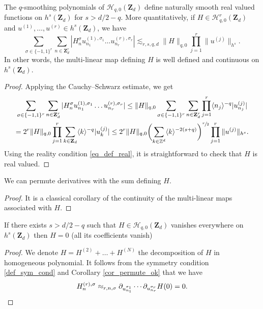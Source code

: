 \begin{lemma}
\label{lem_val_ham}
The $q$-smoothing polynomials of $ \mathscr{H}_{q,0}(\mathbf{Z}_d)$ define naturally smooth real valued functions on $h^s(\mathbf{Z}_d)$ for $s > d/2-q$. More quantitatively, if $H\in \mathscr{H}_{q,0}^r(\mathbf{Z}_d)$ and $u^{(1)},\dots,u^{(r)} \in h^s(\mathbf{Z}_d)$, we have
\[
\sum_{\sigma \in \{-1,1\}^r} \sum_{n\in \mathbf{Z}_d^r } | H_{n}^{\sigma} u_{n_1}^{(1),\sigma_1} \dots u_{n_r}^{(r),\sigma_r} | \lesssim_{r,s,q,d} \| H \|_{q,0} \prod_{j=1}^r\|u^{(j)} \|_{h^s}.
\]
In other words, the multi-linear map defining $H$ is well defined and continuous on $h^s(\mathbf{Z}_d)$.
\end{lemma}
\begin{proof}
Applying the Cauchy--Schwarz estimate, we get
\begin{multline*}
\sum_{\sigma \in \{-1,1\}^r} \sum_{n\in \mathbf{Z}_d^r } | H_{n}^{\sigma} u_{n_1}^{(1),\sigma_1} \dots u_{n_r}^{(r),\sigma_r} | \leq \| H \|_{q,0} \sum_{\sigma \in \{-1,1\}^r} \sum_{n\in \mathbf{Z}_d^r } \prod_{j=1}^r \langle n_j \rangle^{-q} |u_{n_j}^{(j)} |
\\ = 2^r \| H \|_{q,0} \prod_{j=1}^r \sum_{k\in \mathbf{Z}_d } \langle k \rangle^{-q} |u_{k}^{(j)} | \leq 2^r \| H \|_{q,0} \biggl(\sum_{k\in \mathbb{Z}^d } \langle k \rangle^{-2(s+q)} \biggr)^{\sfrac{r}2} \prod_{j=1}^r\|u^{(j)} \|_{h^s}.
\end{multline*}
Using the reality condition \eqref{eq_def_real}, it is straightforward to check that $H$ is real valued.
\end{proof}

\begin{corollary}
\label{cor_permute_ok}
We can permute derivatives with the sum defining $H$.
\end{corollary}
\begin{proof} It is a classical corollary of the continuity of the multi-linear maps associated with $H$.
\end{proof}

\begin{corollary}
\label{cor_uniq}
If there exists $s>d/2-q$ such that $H\in \mathscr{H}_{q,0}(\mathbf{Z}_d)$ vanishes everywhere on $h^s(\mathbf{Z}_d)$ then $H=0$ (\ie all its coefficients vanish)
\end{corollary}
\begin{proof}
We denote $H = H^{(2)} + \dots + H^{(N)}$ the decomposition of $H$ in homogeneous polynomial. It follows from the symmetry condition \eqref{def_sym_cond} and Corollary \ref{cor_permute_ok} that we have
\[
H^{(r),\sigma}_n \approx_{r,n,\sigma} \partial_{u_{n_1}^{\sigma_1}} \cdots \partial_{u_{n_{r}}^{\sigma_{r}}} H(0) = 0.\qedhere
\]
\end{proof}

